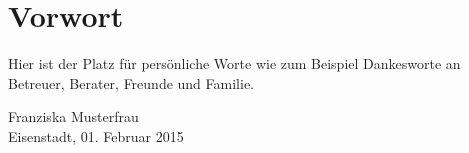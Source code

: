 \newpage
\section*{Vorwort}
Hier ist der Platz für persönliche Worte wie zum Beispiel Dankesworte an Betreuer, Berater, Freunde und Familie.
\vspace{8cm}
\\
\begin{flushright}
	Franziska Musterfrau
	\\Eisenstadt, 01. Februar 2015
\end{flushright}